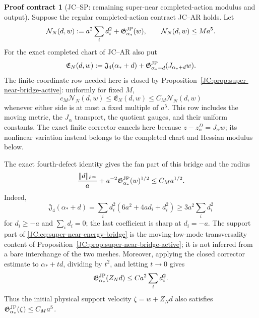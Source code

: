 \documentclass[11pt]{amsart}
\numberwithin{equation}{section}
\theoremstyle{definition}
\newtheorem{contract}[theorem]{Proof contract}
\theoremstyle{remark}
\newcommand{\Jfour}{\mathfrak J_4}
\newcommand{\Gjp}{\mathfrak G^{\rm JP}}
\begin{document}
\begin{contract}[JC--SP: remaining super-near completed-action modulus and output]
\label{JC:con:JC-SP}
Suppose the regular completed-action contract JC--AR holds.  Let
\begin{equation}\label{JC:eq:super-near-energy}
 \mathcal N_N(d,w):=
 a^2\sum_i d_i^2+\Gjp_{\alpha_*}(w),
 \qquad
 \mathcal N_N(d,w)\le Ma^5.
\end{equation}
For the exact completed chart of JC--AR also put
\begin{equation}\label{JC:eq:finite-completed-energy}
 \mathfrak E_N(d,w):=
 \Jfour(\alpha_*+d)+
 \Gjp_{\alpha_*+d}(J_{\alpha_*+d}w).
\end{equation}
The finite-coordinate row needed here is closed by
Proposition~\ref{JC:prop:super-near-bridge-active}: uniformly for fixed $M$,
\begin{equation}\label{JC:eq:super-near-energy-bridge}
 c_M\mathcal N_N(d,w)\le\mathfrak E_N(d,w)
 \le C_M\mathcal N_N(d,w)
\end{equation}
whenever either side is at most a fixed multiple of $a^5$.  This row
includes the moving metric, the $J_\alpha$ transport, the quotient gauges,
and their uniform constants.  The exact finite corrector cancels here
because $z-z_\alpha^D=J_\alpha w$; its nonlinear variation instead belongs
to the completed chart and Hessian modulus below.

The exact fourth-defect identity gives the fan part of this bridge and the
radius
\begin{equation}\label{JC:eq:super-near-radius}
 \frac{\|d\|_{\ell^\infty}}a+
 a^{-2}\Gjp_{\alpha_*}(w)^{1/2}
 \le C_Ma^{1/2}.
\end{equation}
Indeed,
\[
 \Jfour(\alpha_*+d)
 =\sum_i d_i^2(6a^2+4ad_i+d_i^2)
 \ge3a^2\sum_i d_i^2
\]
for $d_i\ge-a$ and $\sum_i d_i=0$; the last coefficient is sharp at
$d_i=-a$.  The support part of
\eqref{JC:eq:super-near-energy-bridge} is the moving-low-mode transversality
content of Proposition~\ref{JC:prop:super-near-bridge-active}; it is not
inferred from a bare interchange of the two meshes.
Moreover, applying the closed corrector estimate to
$\alpha_*+td$, dividing by $t^2$, and letting $t\to0$ gives
\begin{equation}\label{JC:eq:corrector-derivative-bound}
 \Gjp_{\alpha_*}(Z_Nd)\le Ca^2\sum_i d_i^2.
\end{equation}
Thus the initial physical support velocity
$\zeta=w+Z_Nd$ also satisfies
$\Gjp_{\alpha_*}(\zeta)\le C_Ma^5$.


\end{contract}
\end{document}
